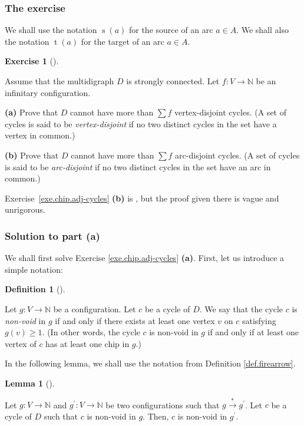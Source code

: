 \documentclass[numbers=enddot,12pt,final,onecolumn,notitlepage]{scrartcl}%
\newcounter{exer}
\theoremstyle{definition}
\newtheorem{lem}[theo]{Lemma}
\newenvironment{lemma}[1][]
{\begin{lem}[#1]\begin{leftbar}}
{\end{leftbar}\end{lem}}
\newtheorem{defi}[theo]{Definition}
\newenvironment{definition}[1][]
{\begin{defi}[#1]\begin{leftbar}}
{\end{leftbar}\end{defi}}
\newtheorem{exmp}[exer]{Exercise}
\newenvironment{exercise}[1][]
{\begin{exmp}[#1]\begin{leftbar}}
{\end{leftbar}\end{exmp}}
\let\sumnonlimits\sum
\renewcommand{\sum}{\sumnonlimits\limits}
\newcommand{\NN}{\mathbb{N}}
\newcommand{\tup}[1]{\left( #1 \right)}
\begin{document}
\subsubsection{The exercise}

We shall use the notation
$\operatorname{s}\tup{a}$ for the source of an arc
$a \in A$.
We shall also the notation
$\operatorname{t}\tup{a}$ for the target of an arc
$a \in A$.

\begin{exercise} \label{exe.chip.adj-cycles}
Assume that the multidigraph $D$ is strongly connected.
Let $f : V \to \NN$ be an infinitary configuration.

\textbf{(a)} Prove that $D$ cannot have more than
$\sum f$ vertex-disjoint cycles.
(A set of cycles is said to be \textit{vertex-disjoint}
if no two distinct cycles in the set have a vertex in
common.)

\textbf{(b)} Prove that $D$ cannot have more than
$\sum f$ arc-disjoint cycles.
(A set of cycles is said to be \textit{arc-disjoint}
if no two distinct cycles in the set have an arc in
common.)
\end{exercise}

Exercise~\ref{exe.chip.adj-cycles} \textbf{(b)} is
\cite[Theorem 2.2]{BjoLov92}, but the proof given there
is vague and unrigorous.

\subsubsection{Solution to part \textbf{(a)}}

We shall first solve Exercise \ref{exe.chip.adj-cycles} \textbf{(a)}.
First, let us introduce a simple notation:

\begin{definition}
\label{def.chip.cycle-non-void}Let $g:V\rightarrow\mathbb{N}$ be a
configuration. Let $c$ be a cycle of $D$. We say that the cycle $c$ is
\textit{non-void} in $g$ if and only if there exists at least one vertex $v$
on $c$ satisfying $g\left(  v\right)  \geq1$. (In other words, the cycle $c$
is non-void in $g$ if and only if at least one vertex of $c$ has at least one
chip in $g$.)
\end{definition}

In the following lemma, we shall use the notation from Definition
\ref{def.firearrow}.

\begin{lemma}
\label{lem.chip.adj-cycles.cycles-preserve}Let $g:V\rightarrow\mathbb{N}$ and
$g^{\prime}:V\rightarrow\mathbb{N}$ be two configurations such that
$g\overset{\ast}{\rightarrow}g^{\prime}$. Let $c$ be a cycle of $D$ such that
$c$ is non-void in $g$. Then, $c$ is non-void in $g^{\prime}$.
\end{lemma}
\end{document}
